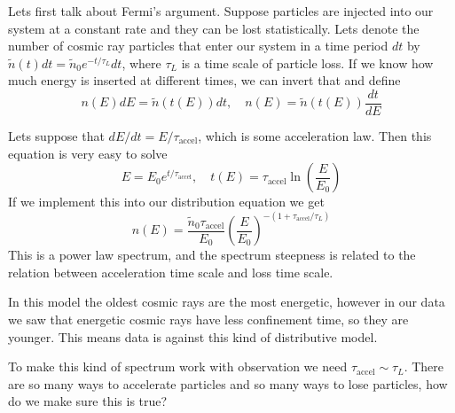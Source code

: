 \documentclass[letterpaper, 11pt]{article}
\numberwithin{equation}{section}
\numberwithin{figure}{section}
\begin{document}
Lets first talk about Fermi's argument. Suppose particles are injected into our
system at a constant rate and they can be lost statistically. Lets denote the
number of cosmic ray particles that enter our system in a time period $dt$ by
$\tilde{n}(t)dt = \tilde{n}_0e^{-t/\tau_L}dt$, where $\tau_L$ is a time scale of
particle loss. If we know how much energy is inserted at different times, we can
invert that and define
\begin{equation}
  \label{eq:4}
  n(E)dE = \tilde{n}(t(E))dt,\quad n(E) = \tilde{n}(t(E))\frac{dt}{dE}
\end{equation}

Lets suppose that $dE/dt = E/\tau_\mathrm{accel}$, which is some acceleration
law. Then this equation is very easy to solve
\begin{equation}
  \label{eq:5}
  E = E_0e^{t/\tau_\mathrm{accel}},\quad t(E) = \tau_\mathrm{accel}\ln \left( \frac{E}{E_0} \right)
\end{equation}
If we implement this into our distribution equation we get
\begin{equation}
  \label{eq:6}
  n(E) = \frac{\tilde{n}_0\tau_\mathrm{accel}}{E_0}\left( \frac{E}{E_0} \right)^{-(1 + \tau_\mathrm{accel}/\tau_L)}
\end{equation}
This is a power law spectrum, and the spectrum steepness is related to the
relation between acceleration time scale and loss time scale.

In this model the oldest cosmic rays are the most energetic, however in our data
we saw that energetic cosmic rays have less confinement time, so they are
younger. This means data is against this kind of distributive model.

To make this kind of spectrum work with observation we need $\tau_\mathrm{accel}
\sim \tau_L$. There are so many ways to accelerate particles and so many
ways to lose particles, how do we make sure this is true?
\end{document}
